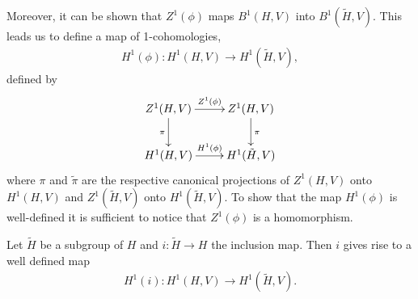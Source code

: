 Moreover, it can be shown that $Z^1(\phi)$ maps $B^1(H, V)$ into $B^1(\tilde{H}, V)$. This leads us to define a map of 1-cohomologies,
\begin{eqnarray*}
	H^1(\phi):H^1(H, V) \rightarrow H^1(\tilde{H}, V),
\end{eqnarray*}
defined by
\begin{displaymath}
	\xymatrix{
	Z^1(H, V) \ar[d]_{\pi} \ar[r]^{Z^1(\phi)} & Z^1(H, V) \ar[d]^{\pi}\\
	H^1(H, V) \ar[r]^{H^1(\phi)} & H^1(\tilde{H}, V)
	}
\end{displaymath}
where $\pi$ and $\tilde\pi$ are the respective canonical projections of $Z^1(H, V)$ onto $H^1(H, V)$ and $Z^1(\tilde{H}, V)$ onto $H^1(\tilde{H}, V)$. To show that the map $H^1(\phi)$ is well-defined it is sufficient to notice that $Z^1(\phi)$ is a homomorphism.

\begin{example}
Let $\tilde{H}$ be a subgroup of $H$ and $i:\tilde{H}\rightarrow H$ the inclusion map. Then $i$ gives rise to a well defined map
\begin{eqnarray*}
H^1(i):H^1(H, V)\rightarrow H^1(\tilde{H}, V).
\end{eqnarray*}
\end{example}

